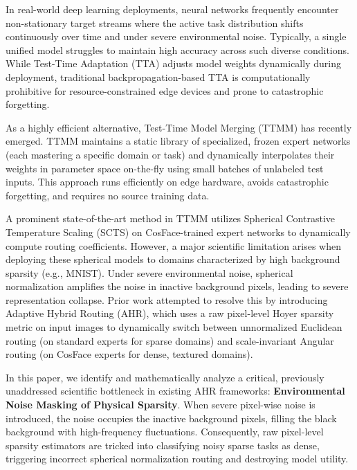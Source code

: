 \documentclass{article}
\theoremstyle{plain}
\theoremstyle{definition}
\theoremstyle{remark}
\begin{document}
In real-world deep learning deployments, neural networks frequently encounter non-stationary target streams where the active task distribution shifts continuously over time and under severe environmental noise. Typically, a single unified model struggles to maintain high accuracy across such diverse conditions. While Test-Time Adaptation (TTA) adjusts model weights dynamically during deployment, traditional backpropagation-based TTA is computationally prohibitive for resource-constrained edge devices and prone to catastrophic forgetting. 

As a highly efficient alternative, Test-Time Model Merging (TTMM) has recently emerged. TTMM maintains a static library of specialized, frozen expert networks (each mastering a specific domain or task) and dynamically interpolates their weights in parameter space on-the-fly using small batches of unlabeled test inputs. This approach runs efficiently on edge hardware, avoids catastrophic forgetting, and requires no source training data.

A prominent state-of-the-art method in TTMM utilizes Spherical Contrastive Temperature Scaling (SCTS) on CosFace-trained expert networks to dynamically compute routing coefficients. However, a major scientific limitation arises when deploying these spherical models to domains characterized by high background sparsity (e.g., MNIST). Under severe environmental noise, spherical normalization amplifies the noise in inactive background pixels, leading to severe representation collapse. Prior work attempted to resolve this by introducing Adaptive Hybrid Routing (AHR), which uses a raw pixel-level Hoyer sparsity metric on input images to dynamically switch between unnormalized Euclidean routing (on standard experts for sparse domains) and scale-invariant Angular routing (on CosFace experts for dense, textured domains).

In this paper, we identify and mathematically analyze a critical, previously unaddressed scientific bottleneck in existing AHR frameworks: \textbf{Environmental Noise Masking of Physical Sparsity}. When severe pixel-wise noise is introduced, the noise occupies the inactive background pixels, filling the black background with high-frequency fluctuations. Consequently, raw pixel-level sparsity estimators are tricked into classifying noisy sparse tasks as dense, triggering incorrect spherical normalization routing and destroying model utility. 
\end{document}

